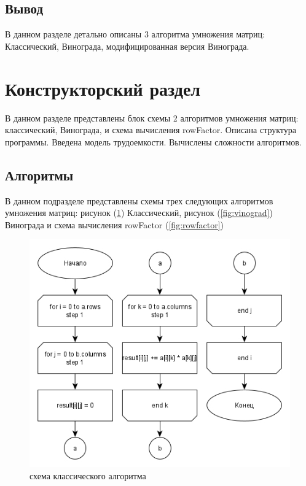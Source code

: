 \documentclass[a4paper, 14pt]{article}
\begin{document}
	\subsection{Вывод}
	
	В данном разделе детально описаны 3 алгоритма умножения матриц: Классический, Винограда, модифицированная версия Винограда.
	
	\newpage
	\section{Конструкторский раздел}
	
	В данном разделе представлены блок схемы 2 алгоритмов умножения матриц: классический, Винограда, и схема вычисления rowFactor. Описана структура программы. Введена модель трудоемкости. Вычислены сложности алгоритмов.
	
	\subsection{Алгоритмы}
	
	В данном подразделе представлены схемы трех следующих алгоритмов умножения матриц: рисунок (\ref{fig:simple}) Классический, рисунок (\ref{fig:vinograd}) Винограда и схема вычисления rowFactor (\ref{fig:rowfactor})
	
	\vspace{1cm}
	
	\begin{figure}[H]
		\centering
		\includegraphics[scale=0.5]{Схемы/simple}
		\caption{схема классического алгоритма}
		\label{fig:simple}
	\end{figure}
	
\end{document}
